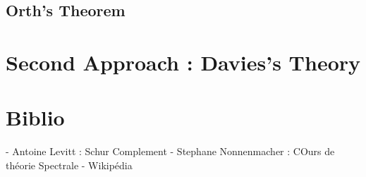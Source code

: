 \documentclass[12pt,openany,a4paper, titlepage]{article}
\theoremstyle{definition}
\theoremstyle{definition}
\theoremstyle{definition}
\theoremstyle{definition}
\theoremstyle{definition}
\begin{document}
\subsection{Orth's Theorem}

\section{Second Approach : Davies's Theory}





\newpage

\appendix
\appendixpage
\addappheadtotoc

\section{Biblio}

- Antoine Levitt : Schur Complement
- Stephane Nonnenmacher : COurs de théorie Spectrale
- Wikipédia %
\end{document}
